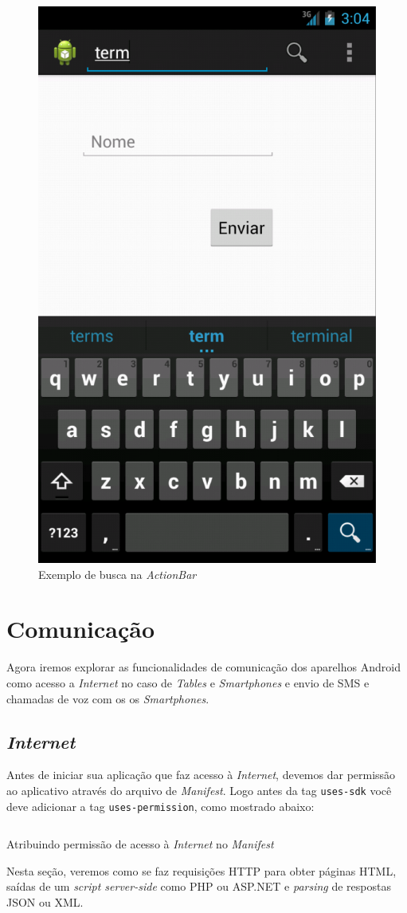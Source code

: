 \documentclass[a4paper,12pt,brazil,oneside]{book}
\begin{document}
\begin{singlespace}
		
	\begin{figure}[H]
	  \centering
	  \includegraphics[width=.3\textwidth]{figuras/design/actionbar-search.png}
	  \caption{Exemplo de busca na \emph{ActionBar}}
	  \label{fig:e20}
	\end{figure}

\chapter{Comunicação}

	Agora iremos explorar as funcionalidades de comunicação dos aparelhos Android como acesso a \emph{Internet} no caso de \emph{Tables} e \emph{Smartphones} e envio de SMS e chamadas de voz com os os \emph{Smartphones}. 

\section{\emph{Internet}}

	Antes de iniciar sua aplicação que faz acesso à \emph{Internet}, devemos dar permissão ao aplicativo através do arquivo de \emph{Manifest}. Logo antes da tag \texttt{uses-sdk} você deve adicionar a tag \texttt{uses-permission}, como mostrado abaixo:

		\begin{listing}[H]
		\inputminted[linenos=true,fontsize=\small,frame=lines, framesep=2mm, tabsize=2,numbersep=5pt]{xml}{src/api/comm/permission-internet.xml}
		\caption{Atribuindo permissão de acesso à \emph{Internet} no \emph{Manifest}}
		\label{code:permission-internet}
		\end{listing}

		Nesta seção, veremos como se faz requisições HTTP para obter páginas HTML, saídas de um \emph{script server-side} como PHP ou ASP.NET e \emph{parsing} de respostas JSON ou XML.		 


\end{singlespace}
\end{document}
